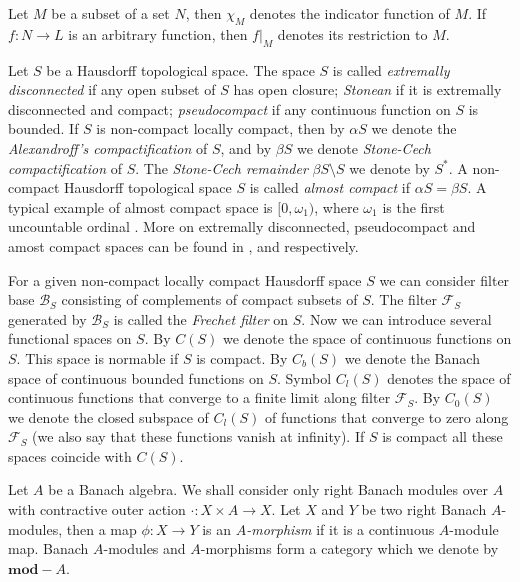 \documentclass[12pt]{article}
\begin{document}
Let $M$ be a subset of a set $N$, then $\chi_M$ denotes the indicator function of $M$. If $f:N\to L$ is an arbitrary function, then $f|_M$ denotes its restriction to $M$.

Let $S$ be a Hausdorff topological space. The space $S$ is called \textit{extremally disconnected} if any open subset of $S$ has open closure; \textit{Stonean} if it is extremally disconnected and compact; \textit{pseudocompact} if any continuous function on $S$ is bounded. If $S$ is non-compact locally compact, then by $\alpha S$ we denote the \textit{Alexandroff's compactification} of $S$, and by $\beta S$ we denote \textit{Stone-Cech compactification} of $S$. The \textit{Stone-Cech remainder} $\beta S\setminus S$ we denote by $S^*$. A non-compact Hausdorff topological space $S$ is called \textit{almost compact} if $\alpha S=\beta S$. A typical example of almost compact space is $[0, \omega_1)$, where $\omega_1$ is the first uncountable ordinal \cite[paragraph 1.3]{HrusPsdCompTopSp}. More on extremally disconnected, pseudocompact and amost compact spaces can be found in \cite[section 6.2]{EngkingGenTop}, \cite[section 3.10]{EngkingGenTop} and \cite[paragraph 1.3]{HrusPsdCompTopSp} respectively.

For a given non-compact locally compact Hausdorff space $S$ we can consider filter base $\mathcal{B}_S$ consisting of complements of compact subsets of $S$. The filter $\mathcal{F}_S$ generated by $\mathcal{B}_S$ is called the \textit{Frechet filter} on $S$. Now we can introduce several functional spaces on $S$. By $C(S)$ we denote the space of continuous functions on $S$. This space is normable if $S$ is compact. By $C_b(S)$ we denote the Banach space of continuous bounded functions on $S$. Symbol $C_l(S)$ denotes the space of continuous functions that converge to a finite limit along filter $\mathcal{F}_S$. By $C_0(S)$ we denote the closed subspace of $C_l(S)$ of functions that converge to zero along $\mathcal{F}_S$ (we also say that these functions vanish at infinity). If $S$ is compact all these spaces coincide with $C(S)$.

Let $A$ be a Banach algebra. We shall consider only right Banach modules over $A$ with contractive outer action $\cdot:X\times A\to X$. Let $X$ and $Y$ be two right Banach $A$-modules, then a map $\phi:X\to Y$ is an \textit{$A$-morphism} if it is a continuous $A$-module map. Banach $A$-modules and $A$-morphisms form a category which we denote by $\mathbf{mod}-A$.
\end{document}
